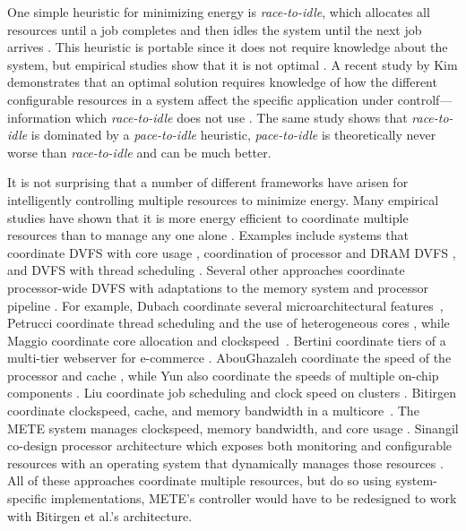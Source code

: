 One simple heuristic for minimizing energy is \emph{race-to-idle}, which allocates all resources until a job completes and then idles the system until the next job arrives \cite{google}.
This heuristic is portable since it does not require knowledge about the system, but empirical studies show that it is not optimal \cite{google,Cheng2009,Yun2010,Yang2007}.
A recent study by Kim \etal demonstrates that an optimal solution requires knowledge of how the different configurable resources in a system affect the specific application under controlf---information which \emph{race-to-idle} does not use \cite{kim-cpsna2015}.
The same study shows that \emph{race-to-idle} is dominated by a \emph{pace-to-idle} heuristic, \ie \emph{pace-to-idle} is theoretically never worse than \emph{race-to-idle} and can be much better.

It is not surprising that a number of different frameworks have arisen for intelligently controlling multiple resources to minimize energy.
Many empirical studies have shown that it is more energy efficient to coordinate multiple resources than to manage any one alone \cite{google,Cheng2009,Yun2010,Yang2007}.
Examples include systems that coordinate DVFS with core usage \cite{packandcap-old,packandcap-new,TCST}, coordination of processor and DRAM DVFS \cite{CoScale,Chen2011,Felter2005,Li2007}, and DVFS with thread scheduling \cite{Rangan2009,Winter2010}.
Several other approaches coordinate processor-wide DVFS with adaptations to the memory system and processor pipeline \cite{METE,Bitirgen2008,dubach2010}.
For example, Dubach \etal coordinate several microarchitectural features~\cite{dubach2010},
Petrucci \etal coordinate thread scheduling and the use of heterogeneous cores \cite{Petrucci2012}, while Maggio \etal coordinate core allocation and clockspeed~\cite{TCST}.
Bertini \etal coordinate tiers of a multi-tier webserver for e-commerce \cite{Bertini2007}.
AbouGhazaleh \etal coordinate the speed of the processor and cache \cite{AbouGhazaleh2007}, while Yun \etal also coordinate the speeds of multiple on-chip components \cite{Yun2010}.
Liu \etal coordinate job scheduling and clock speed on clusters \cite{Liu2008}.
Bitirgen \etal coordinate clockspeed, cache, and memory bandwidth in a multicore~\cite{Bitirgen2008}.
The METE system manages clockspeed, memory bandwidth, and core usage \cite{METE}.
Sinangil \etal co-design processor architecture which exposes both monitoring and configurable resources with an operating system that dynamically manages those resources \cite{sinangil2014self}.
All of these approaches coordinate multiple resources, but do so using system-specific implementations, \eg METE's controller would have to be redesigned to work with Bitirgen et al.'s architecture.

